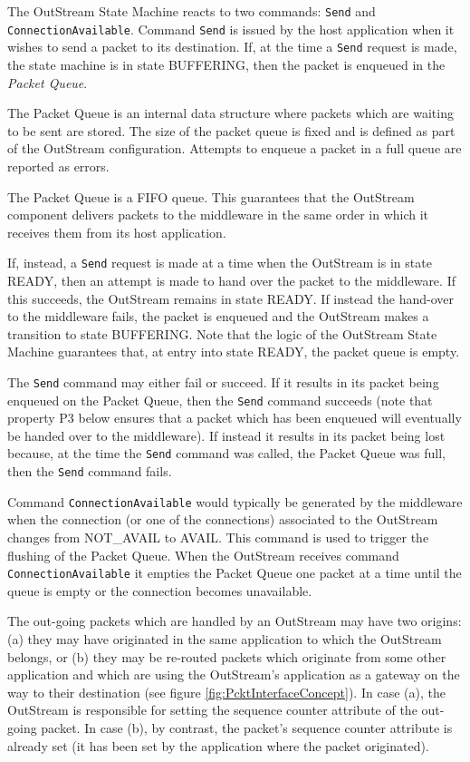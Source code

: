 The OutStream State Machine reacts to two commands: \texttt{Send} and \texttt{ConnectionAvailable}. Command \texttt{Send} is issued by the host application when it wishes to send a packet to its destination. If, at the time a \texttt{Send} request is made, the state machine is in state BUFFERING, then the packet is enqueued in the \textit{Packet Queue}. 

The Packet Queue is an internal data structure where packets which are waiting to be sent are stored. The size of the packet queue is fixed and is defined as part of the OutStream configuration. Attempts to enqueue a packet in a full queue are reported as errors.

The Packet Queue is a FIFO queue. This guarantees that the OutStream component delivers packets to the middleware in the same order in which it receives them from its host application. 

If, instead, a \texttt{Send} request is made at a time when the OutStream is in state READY, then an attempt is made to hand over the packet to the middleware. If this succeeds, the OutStream remains in state READY. If instead the hand-over to the middleware fails, the packet is enqueued and the OutStream makes a transition to state BUFFERING. Note that the logic of the OutStream State Machine guarantees that, at entry into state READY, the packet queue is empty.
 
The \texttt{Send} command may either fail or succeed. If it results in its packet being enqueued on the Packet Queue, then the \texttt{Send} command succeeds (note that property P3 below ensures that a packet which has been enqueued will eventually be handed over to the middleware). If instead it results in its packet being lost because, at the time the \texttt{Send} command was called, the Packet Queue was full, then the \texttt{Send} command fails. 

Command \texttt{ConnectionAvailable} would typically be generated by the middleware when the connection (or one of the connections) associated to the OutStream changes from NOT\_AVAIL to AVAIL. This command is used to trigger the flushing of the Packet Queue. When the OutStream receives command \texttt{ConnectionAvailable} it empties the Packet Queue one packet at a time until the queue is empty or the connection becomes unavailable.

The out-going packets which are handled by an OutStream may have two origins: (a) they may have originated in the same application to which the OutStream belongs, or (b) they may be re-routed packets which originate from some other application and which are using the OutStream's application as a gateway on the way to their destination (see figure \ref{fig:PcktInterfaceConcept}). In case (a), the OutStream is responsible for setting the sequence counter attribute of the out-going packet. In case (b), by contrast, the packet's sequence counter attribute is already set (it has been set by the application where the packet originated).

